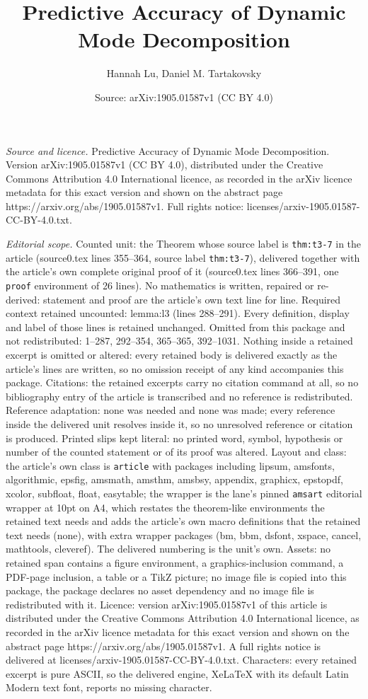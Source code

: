\documentclass[10pt,a4paper]{amsart}
\title[Predictive Accuracy of Dynamic Mode Decomposition]{Predictive Accuracy of Dynamic Mode Decomposition}
\author{Hannah Lu, Daniel M. Tartakovsky}
\date{Source: arXiv:1905.01587v1 (CC BY 4.0)}
\begin{document}
\maketitle

\noindent\emph{Source and licence.} Predictive Accuracy of Dynamic Mode Decomposition. Version arXiv:1905.01587v1 (CC BY 4.0), distributed under the Creative Commons Attribution 4.0 International licence, as recorded in the arXiv licence metadata for this exact version and shown on the abstract page https://arxiv.org/abs/1905.01587v1. Full rights notice: licenses/arxiv-1905.01587-CC-BY-4.0.txt.\par\smallskip

\noindent\textit{Editorial scope.} Counted unit: the Theorem whose source label is \texttt{thm:t3-7} in the article (source0.tex lines 355--364, source label \texttt{thm:t3-7}), delivered together with the article's own complete original proof of it (source0.tex lines 366--391, one \texttt{proof} environment of 26 lines). No mathematics is written, repaired or re-derived: statement and proof are the article's own text line for line. Required context retained uncounted: lemma:l3 (lines 288--291). Every definition, display and label of those lines is retained unchanged. Omitted from this package and not redistributed: 1--287, 292--354, 365--365, 392--1031. Nothing inside a retained excerpt is omitted or altered: every retained body is delivered exactly as the article's lines are written, so no omission receipt of any kind accompanies this package. Citations: the retained excerpts carry no citation command at all, so no bibliography entry of the article is transcribed and no reference is redistributed. Reference adaptation: none was needed and none was made; every reference inside the delivered unit resolves inside it, so no unresolved reference or citation is produced. Printed slips kept literal: no printed word, symbol, hypothesis or number of the counted statement or of its proof was altered. Layout and class: the article's own class is \texttt{article} with packages including lipsum, amsfonts, algorithmic, epsfig, amsmath, amsthm, amsbsy, appendix, graphicx, epstopdf, xcolor, subfloat, float, easytable; the wrapper is the lane's pinned \texttt{amsart} editorial wrapper at 10pt on A4, which restates the theorem-like environments the retained text needs and adds the article's own macro definitions that the retained text needs (none), with extra wrapper packages (bm, bbm, dsfont, xspace, cancel, mathtools, cleveref). The delivered numbering is the unit's own. Assets: no retained span contains a figure environment, a graphics-inclusion command, a PDF-page inclusion, a table or a TikZ picture; no image file is copied into this package, the package declares no asset dependency and no image file is redistributed with it. Licence: version arXiv:1905.01587v1 of this article is distributed under the Creative Commons Attribution 4.0 International licence, as recorded in the arXiv licence metadata for this exact version and shown on the abstract page https://arxiv.org/abs/1905.01587v1. A full rights notice is delivered at licenses/arxiv-1905.01587-CC-BY-4.0.txt. Characters: every retained excerpt is pure ASCII, so the delivered engine, XeLaTeX with its default Latin Modern text font, reports no missing character.
\end{document}
